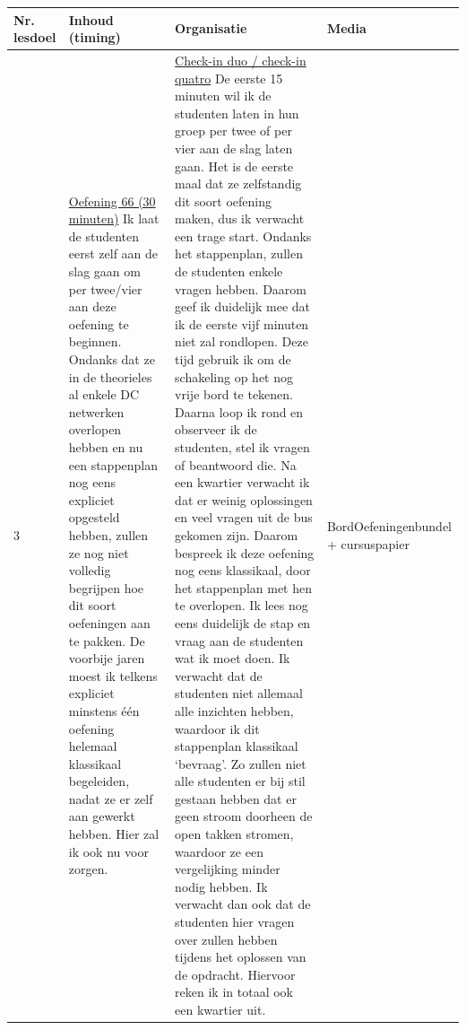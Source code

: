 \begin{landscape}
\begin{tabularx}{1.56\textwidth}{|p{1.5cm}|p{6cm}|X|p{4cm}|}
	\hline
	\textbf{Nr. lesdoel } & \textbf{Inhoud (timing)}  & \textbf{Organisatie } & \textbf{Media } \\ \hline
	3\newline 4\newline 6 &\underline{Oefening 66 (30 minuten)}\newline
	Ik laat de studenten eerst zelf aan de slag gaan om per twee/vier aan deze oefening te beginnen. Ondanks dat ze in de theorieles al enkele DC netwerken overlopen hebben en nu een stappenplan nog eens expliciet opgesteld hebben, zullen ze nog niet volledig begrijpen hoe dit soort oefeningen aan te pakken. De voorbije jaren moest ik telkens expliciet minstens één oefening helemaal klassikaal begeleiden, nadat ze er zelf aan gewerkt hebben. Hier zal ik ook nu voor zorgen.
	&  \underline{Check-in duo / check-in quatro}\newline
	De eerste 15 minuten wil ik de studenten laten in hun groep per twee of per vier aan de slag laten gaan. Het is de eerste maal dat ze zelfstandig dit soort oefening maken, dus ik verwacht een trage start. Ondanks het stappenplan, zullen de studenten enkele vragen hebben. Daarom geef ik duidelijk mee dat ik de eerste vijf minuten niet zal rondlopen. Deze tijd gebruik ik om de schakeling op het nog vrije bord te tekenen.\newline
	Daarna loop ik rond en observeer ik de studenten, stel ik vragen of beantwoord die. Na een kwartier verwacht ik dat er weinig oplossingen en veel vragen uit de bus gekomen zijn. Daarom bespreek ik deze oefening nog eens klassikaal, door het stappenplan met hen te overlopen. Ik lees nog eens duidelijk de stap en vraag aan de studenten wat ik moet doen.\newline
	Ik verwacht dat de studenten niet allemaal alle inzichten hebben, waardoor ik dit stappenplan klassikaal `bevraag'. Zo zullen niet alle studenten er bij stil gestaan hebben dat er geen stroom doorheen de open takken stromen, waardoor ze een vergelijking minder nodig hebben. Ik verwacht dan ook dat de studenten hier vragen over zullen hebben tijdens het oplossen van de opdracht. Hiervoor reken ik in totaal ook een kwartier uit.
	& Bord\newline Oefeningenbundel + cursuspapier
	\\ \hline
\end{tabularx}



\end{landscape}
